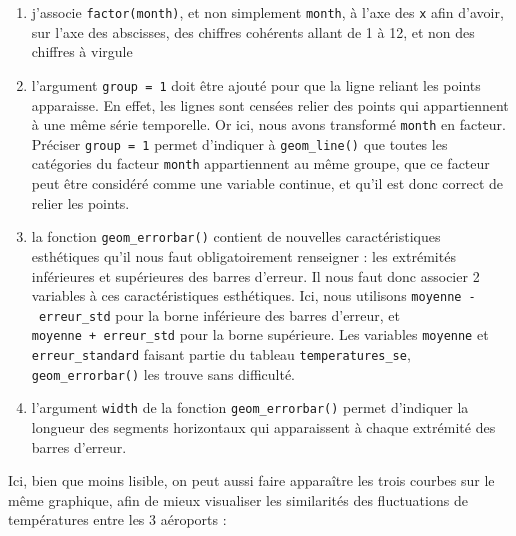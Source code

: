 \documentclass[
  a4paper,
  DIV=11,
  numbers=noendperiod,
  oneside]{scrreprt}
\providecommand{\tightlist}{%
  \setlength{\itemsep}{0pt}\setlength{\parskip}{0pt}}\usepackage{longtable,booktabs,array}
\begin{document}
\begin{enumerate}
\def\labelenumi{\arabic{enumi}.}
\tightlist
\item
  j'associe \texttt{factor(month)}, et non simplement \texttt{month}, à
  l'axe des \texttt{x} afin d'avoir, sur l'axe des abscisses, des
  chiffres cohérents allant de 1 à 12, et non des chiffres à virgule
\item
  l'argument \texttt{group\ =\ 1} doit être ajouté pour que la ligne
  reliant les points apparaisse. En effet, les lignes sont censées
  relier des points qui appartiennent à une même série temporelle. Or
  ici, nous avons transformé \texttt{month} en facteur. Préciser
  \texttt{group\ =\ 1} permet d'indiquer à \texttt{geom\_line()} que
  toutes les catégories du facteur \texttt{month} appartiennent au même
  groupe, que ce facteur peut être considéré comme une variable
  continue, et qu'il est donc correct de relier les points.
\item
  la fonction \texttt{geom\_errorbar()} contient de nouvelles
  caractéristiques esthétiques qu'il nous faut obligatoirement
  renseigner : les extrémités inférieures et supérieures des barres
  d'erreur. Il nous faut donc associer 2 variables à ces
  caractéristiques esthétiques. Ici, nous utilisons
  \texttt{moyenne\ -\ erreur\_std} pour la borne inférieure des barres
  d'erreur, et \texttt{moyenne\ +\ erreur\_std} pour la borne
  supérieure. Les variables \texttt{moyenne} et
  \texttt{erreur\_standard} faisant partie du tableau
  \texttt{temperatures\_se}, \texttt{geom\_errorbar()} les trouve sans
  difficulté.
\item
  l'argument \texttt{width} de la fonction \texttt{geom\_errorbar()}
  permet d'indiquer la longueur des segments horizontaux qui
  apparaissent à chaque extrémité des barres d'erreur.
\end{enumerate}

Ici, bien que moins lisible, on peut aussi faire apparaître les trois
courbes sur le même graphique, afin de mieux visualiser les similarités
des fluctuations de températures entre les 3 aéroports :
\end{document}
